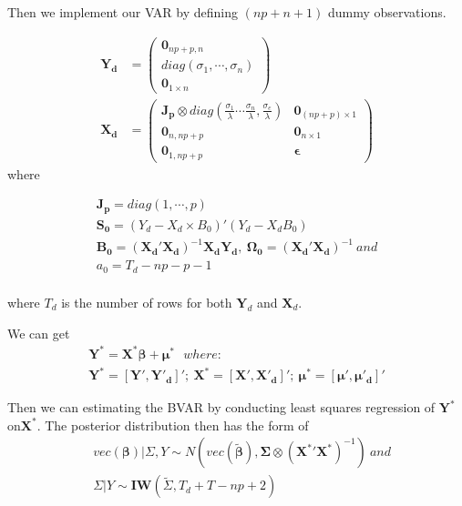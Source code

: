 \documentclass{monashthesis}
\begin{document}
Then we implement our VAR by defining \((np+n+1)\) dummy observations.

\[
\begin{aligned}
\boldsymbol{Y_d}&=
\begin{pmatrix}
\boldsymbol0_{np+p,n}\\
diag({\sigma_1,\cdots,\sigma_n})\\
\boldsymbol0_{1\times n}
\end{pmatrix}\\
\boldsymbol{X_d}&=
\begin{pmatrix}
\boldsymbol{J_p}\otimes diag(\frac{\sigma_1}{\lambda}\cdots\frac{\sigma_n}{\lambda},\frac{\sigma_e}{\lambda})&\boldsymbol0_{(np+p)\times1}\\
\boldsymbol 0_{n,np+p}&\boldsymbol 0_{n\times1}
\\
\boldsymbol 0_{1,np+p}&\boldsymbol{\epsilon}
\end{pmatrix}
\end{aligned}
\] where

\[
\begin{aligned}
\boldsymbol{J_p}=diag(1,\cdots,p)\\
\boldsymbol{S_0}=(Y_d-X_d\times B_0)'(Y_d-X_dB_0)\\
\boldsymbol{B_0}=(\boldsymbol{X_d}'\boldsymbol{X_d})^{-1}\boldsymbol{X_d}\boldsymbol{Y_d},\ \boldsymbol{\Omega_0}=(\boldsymbol{X_d}'\boldsymbol{X_d})^{-1}\  and\\
a_0=T_d-np-p-1\\
\end{aligned}
\]

where \(T_d\) is the number of rows for both \(\boldsymbol{Y}_d\) and \(\boldsymbol{X}_d\).

We can get
\[
\begin{aligned}
\boldsymbol{Y^*}=\boldsymbol{X^*}\boldsymbol{\beta}+\boldsymbol{\mu}^*\ \ \  where: \\
\boldsymbol{Y^*}=[\boldsymbol{Y'},\boldsymbol{Y'_d}]';\ \boldsymbol{X^*}=[\boldsymbol{X'},\boldsymbol{X'_d}]';\ \boldsymbol{\mu^*}=[\boldsymbol{\mu'},\boldsymbol{\mu'_d}]'
\end{aligned}
\]

Then we can estimating the BVAR by conducting least squares regression of \(\boldsymbol{Y}^*\) on\(\boldsymbol{X}^*\). The posterior distribution then has the form of
\[
\begin{aligned}
&vec(\mathbf{\beta})|\Sigma,Y\sim N(vec(\boldsymbol{\tilde\beta}),\boldsymbol{\Sigma}\otimes(\boldsymbol{X^*}'\boldsymbol{X^*})^{-1})\ and\\
&\Sigma|Y\sim\mathbf{IW}(\tilde\Sigma,T_d+T-np+2)
\end{aligned}
\]
\end{document}
